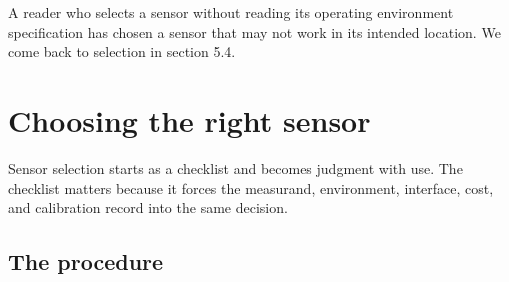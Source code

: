 A reader who selects a sensor without reading its operating
environment specification has chosen a sensor that may not work in
its intended location. We come back to selection in section 5.4.

\section{Choosing the right sensor}

Sensor selection starts as a checklist and becomes judgment with
use. The checklist matters because it forces the measurand,
environment, interface, cost, and calibration record into the same
decision.

\subsection{The procedure}

